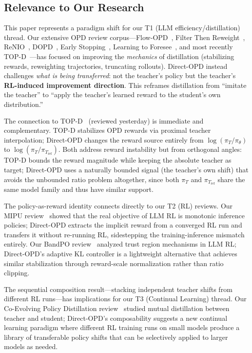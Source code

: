 \documentclass[11pt,a4paper]{article}
\begin{document}
\subsection{Relevance to Our Research}

This paper represents a paradigm shift for our T1 (LLM efficiency/distillation) thread. Our extensive OPD review corpus---Flow-OPD~\cite{flowopd2026}, Filter Then Reweight~\cite{filter2026}, ReNIO~\cite{renio2026}, DOPD~\cite{dopd2026}, Early Stopping~\cite{earlystop2026}, Learning to Foresee~\cite{foresee2026}, and most recently TOP-D~\cite{topd2026}---has focused on improving the \emph{mechanics} of distillation (stabilizing rewards, reweighting trajectories, truncating rollouts). Direct-OPD instead challenges \emph{what is being transferred}: not the teacher's policy but the teacher's \textbf{RL-induced improvement direction}. This reframes distillation from ``imitate the teacher'' to ``apply the teacher's learned reward to the student's own distribution.''

The connection to TOP-D~\cite{topd2026} (reviewed yesterday) is immediate and complementary. TOP-D stabilizes OPD rewards via proximal teacher interpolation; Direct-OPD changes the reward source entirely from $\log(\pi_T / \pi_\theta)$ to $\log(\pi_T / \pi_{T_\mathrm{ref}})$. Both address reward instability but from orthogonal angles: TOP-D bounds the reward magnitude while keeping the absolute teacher as target; Direct-OPD uses a naturally bounded signal (the teacher's own shift) that avoids the unbounded ratio problem altogether, since both $\pi_T$ and $\pi_{T_\mathrm{ref}}$ share the same model family and thus have similar support.

The policy-as-reward identity connects directly to our T2 (RL) reviews. Our MIPU review~\cite{mirage2026} showed that the real objective of LLM RL is monotonic inference policies; Direct-OPD extracts the implicit reward from a converged RL run and transfers it without re-running RL, sidestepping the training-inference mismatch entirely. Our BandPO review~\cite{bandpo2026} analyzed trust region mechanisms in LLM RL; Direct-OPD's adaptive KL controller is a lightweight alternative that achieves similar stabilization through reward-scale normalization rather than ratio clipping.

The sequential composition result---stacking independent teacher shifts from different RL runs---has implications for our T3 (Continual Learning) thread. Our Co-Evolving Policy Distillation review~\cite{coevolve2026} studied mutual distillation between teacher and student; Direct-OPD's composability suggests a new continual learning paradigm where different RL training runs on small models produce a library of transferable policy shifts that can be selectively applied to larger models as needed.
\end{document}
